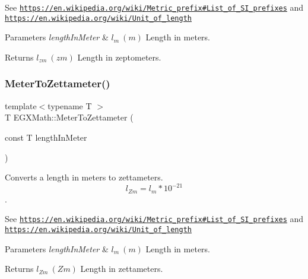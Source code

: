 See \href{https://en.wikipedia.org/wiki/Metric_prefix#List_of_SI_prefixes}{\tt https\+://en.\+wikipedia.\+org/wiki/\+Metric\+\_\+prefix\#\+List\+\_\+of\+\_\+\+S\+I\+\_\+prefixes} and \href{https://en.wikipedia.org/wiki/Unit_of_length}{\tt https\+://en.\+wikipedia.\+org/wiki/\+Unit\+\_\+of\+\_\+length} 
\begin{DoxyParams}{Parameters}
{\em length\+In\+Meter} & $ l_{m}\ (m)$ Length in meters. \\
\hline
\end{DoxyParams}
\begin{DoxyReturn}{Returns}
$ l_{zm}\ (zm)$ Length in zeptometers. 
\end{DoxyReturn}
\mbox{\label{group___e_g_x_math-_conversions-_length_conversions-_meter-_s_i_gafbd51e362ddfd28f270450693783f5c6}} 
\subsubsection{\texorpdfstring{Meter\+To\+Zettameter()}{MeterToZettameter()}}
{\footnotesize\ttfamily template$<$typename T $>$ \\
T E\+G\+X\+Math\+::\+Meter\+To\+Zettameter (\begin{DoxyParamCaption}\item[{const T}]{length\+In\+Meter }\end{DoxyParamCaption})}



Converts a length in meters to zettameters. \[ l_{Zm}=l_{m} * 10^{-21} \]. 

See \href{https://en.wikipedia.org/wiki/Metric_prefix#List_of_SI_prefixes}{\tt https\+://en.\+wikipedia.\+org/wiki/\+Metric\+\_\+prefix\#\+List\+\_\+of\+\_\+\+S\+I\+\_\+prefixes} and \href{https://en.wikipedia.org/wiki/Unit_of_length}{\tt https\+://en.\+wikipedia.\+org/wiki/\+Unit\+\_\+of\+\_\+length} 
\begin{DoxyParams}{Parameters}
{\em length\+In\+Meter} & $ l_{m}\ (m)$ Length in meters. \\
\hline
\end{DoxyParams}
\begin{DoxyReturn}{Returns}
$ l_{Zm}\ (Zm)$ Length in zettameters. 
\end{DoxyReturn}
